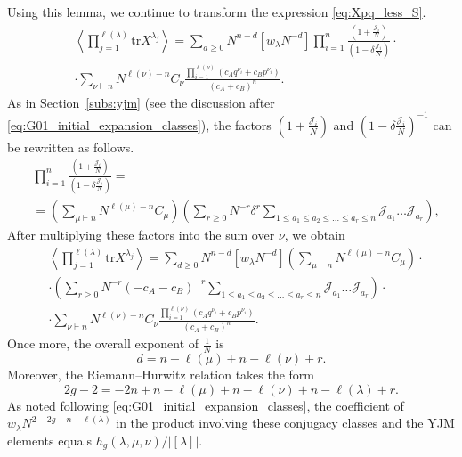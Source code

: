 \documentclass{article}
\newcommand{\tr}{\mathrm{tr}}
\theoremstyle{plain}
\theoremstyle{definition}
\numberwithin{equation}{section}
\begin{document}
Using this lemma, we continue to transform the expression \eqref{eq:Xpq_less_S}.
\begin{equation}
    \label{eq:Xpq_final_inter_classes}
    \begin{aligned}
        & \left\langle \prod_{j=1}^{\ell(\lambda)} \tr X^{\lambda_{j}} \right\rangle = \sum\limits_{d\ge 0}  N^{n- d} [w_\lambda N^{-d}]\prod_{i=1}^n \frac{\left(1+\frac{\mathcal{J}_i}{N}\right)}{\left(1- \delta \frac{\mathcal{J}_i}{N}\right)} \cdot \\
        & \cdot \sum_{\nu \vdash n}   N^{\ell(\nu)-n} C_\nu \frac{\prod_{i=1}^{\ell(\nu)} (c_A q^{\nu_i} + c_B p^{\nu_i})}{(c_A+c_B)^{n}}.
    \end{aligned}
\end{equation}
As in Section~\ref{subs:yjm} (see the discussion after \eqref{eq:G01_initial_expansion_classes}), the factors $\left(1+\frac{\mathcal{J}_i}{N}\right)$ and $\left(1- \delta \frac{\mathcal{J}_i}{N}\right)^{-1}$ can be rewritten as follows. 
\begin{equation}
    \label{eq:factors_to_sums}
    \begin{aligned}
        &\prod_{i=1}^n \frac{\left(1+\frac{\mathcal{J}_i}{N}\right)}{\left(1- \delta \frac{\mathcal{J}_i}{N}\right)} = \\
        & = \left(\sum_{\mu \vdash n}N^{\ell(\mu)-n} C_\mu \right) \left(\sum_{r\ge 0}N^{-r}\delta^r \sum_{1 \le a_1 \le a_2 \le \dots \le a_r \le n}\mathcal{J}_{a_1}\dots \mathcal{J}_{a_r}\right),
    \end{aligned}
\end{equation}
After multiplying these factors into the sum over $\nu$, we obtain
\begin{equation}
    \label{eq:Xpq_final_classes}
    \begin{aligned}
        & \left\langle \prod_{j=1}^{\ell(\lambda)} \tr X^{\lambda_{j}} \right\rangle = \sum\limits_{d\ge 0}  N^{n- d} [w_\lambda N^{-d}] \left(\sum_{\mu \vdash n}N^{\ell(\mu)-n} C_\mu \right)\cdot \\
        & \cdot  \left(\sum_{r\ge 0}N^{-r}(-c_A - c_B)^{-r} \sum_{1 \le a_1 \le a_2 \le \dots \le a_r \le n}\mathcal{J}_{a_1}\dots \mathcal{J}_{a_r}\right) \cdot \\
        & \cdot \sum_{\nu \vdash n}   N^{\ell(\nu)-n} C_\nu \frac{\prod_{i=1}^{\ell(\nu)} (c_A q^{\nu_i} + c_B p^{\nu_i})}{(c_A+c_B)^{n}}.
    \end{aligned}
\end{equation}
Once more, the overall exponent of $\frac1N$ is
\begin{equation}
    d = n-\ell(\mu) + n - \ell(\nu) + r.
\end{equation}
Moreover, the Riemann--Hurwitz relation takes the form
\begin{equation}
    2g-2 = -2n + n -\ell(\mu) + n - \ell(\nu) + n - \ell(\lambda) + r.
\end{equation}
As noted following \eqref{eq:G01_initial_expansion_classes}, the coefficient of $w_\lambda N^{2-2g - n - \ell(\lambda)}$ in the product involving these conjugacy classes and the YJM elements equals $h_g(\lambda, \mu ,\nu)/ |[\lambda]|$.
\end{document}
